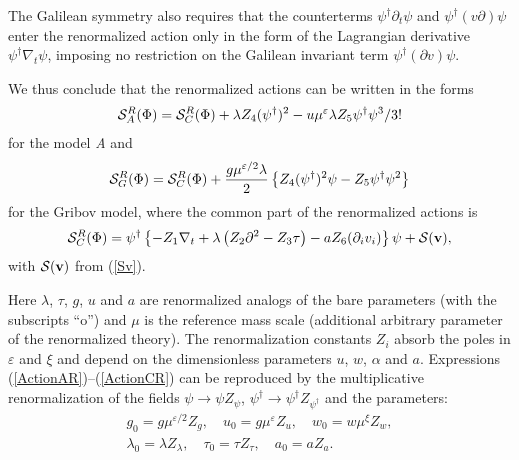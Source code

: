 \documentclass[12pt]{iopart}
\def\S{{\cal S}}
\def\bfv{{\bf v}}
\begin{document}
The Galilean symmetry also requires that the counterterms
$\psi^{\dag}\partial_{t}\psi$ and $\psi^{\dag} (v\partial) \psi $
enter the renormalized action only in the form of the Lagrangian
derivative $\psi^{\dag}\nabla_{t}\psi$, imposing no restriction on
the Galilean invariant term $\psi^{\dag} (\partial v) \psi $.


We thus conclude that the renormalized actions can be written in the forms
\begin{eqnarray}
\S_{A}^{R}(\Phi) = \S_{C}^{R}(\Phi) +
\lambda Z_{4}  (\psi^{\dag})^{2} -
u\mu^{\varepsilon} \lambda Z_{5}  \psi^{\dag} \psi^{3} /3!
\label{ActionAR}
\end{eqnarray}
for the model {\it A} and
\begin{eqnarray}
\S_{G}^{R}(\Phi) = \S_{C}^{R}(\Phi)
+ \frac{g\mu^{\varepsilon/2}\lambda}{2} \left\{ Z_{4}(\psi^{\dagger})^2\psi
- Z_{5} \psi^{\dagger}\psi^2  \right\}
\label{ActionGR}
\end{eqnarray}
for the Gribov model, where the common part of the
renormalized actions is
\begin{eqnarray}
\S_{C}^{R}(\Phi) =  \psi^{\dag} \left\{
- Z_{1} \nabla_{t} + \lambda\left( Z_{2} \partial^{2}- Z_{3}\tau\right)
- a Z_{6} (\partial_{i}v_{i}) \right\} \psi +  \S(\bfv),
\label{ActionCR}
\end{eqnarray}
with $\S(\bfv)$ from (\ref{Sv}).

Here $\lambda$, $\tau$, $g$, $u$ and $a$ are renormalized analogs of the
bare parameters (with the subscripts ``o'') and $\mu$ is the reference mass
scale (additional arbitrary parameter of the renormalized theory). The
renormalization constants $Z_{i}$ absorb the poles in $\varepsilon$ and $\xi$ and
depend on the dimensionless parameters $u$, $w$, $\alpha$ and $a$.
Expressions (\ref{ActionAR})--(\ref{ActionCR}) can be reproduced by the
multiplicative renormalization of the fields $\psi \to \psi Z_{\psi}$,
$\psi^{\dag} \to \psi^{\dag} Z_{\psi^{\dag}}$
and the parameters:
\begin{eqnarray}
g_{0} = g \mu^{\varepsilon/2} Z_{g}, \quad u_{0} = g \mu^{\varepsilon} Z_{u}, \quad
w_{0} = w \mu^{\xi} Z_{w}, \nonumber \\
\lambda_{0} = \lambda Z_{\lambda}, \quad
\tau_{0} = \tau Z_{\tau},  \quad  a_{0} = a Z_{a}.
\label{Multy}
\end{eqnarray}
\end{document}
